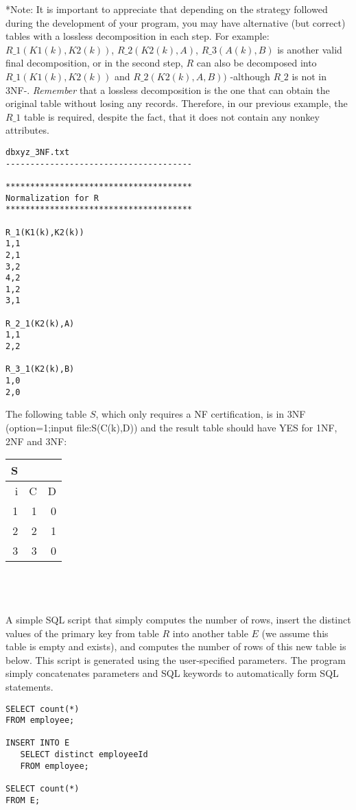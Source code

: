 *Note: It is important to appreciate that depending on the strategy followed during the development of your program, you may
have alternative (but correct) tables with a lossless decomposition in each step. For example: $R\_1(K1(k),K2(k))$, $R\_2(K2(k),A)$, $R\_3(A(k),B)$ is
another valid final decomposition, or in the second step, $R$ can also be decomposed into $R\_1(K1(k),K2(k))$ and $R\_2(K2(k),A,B))$ -although $R\_2$ is not in 3NF-.
\emph{Remember} that a lossless decomposition is the one that can obtain the original table without losing any records. Therefore, in our previous example, the $R\_1$ table is required, despite the fact, that it does not contain any nonkey attributes.

\begin{verbatim}
dbxyz_3NF.txt
--------------------------------------

**************************************
Normalization for R
**************************************

R_1(K1(k),K2(k))
1,1
2,1
3,2
4,2
1,2
3,1

R_2_1(K2(k),A)
1,1
2,2

R_3_1(K2(k),B)
1,0
2,0
\end{verbatim}
The following table $S$, which only requires a NF certification, is in 3NF (option=1;input file:S(C(k),D)) and the result table should have YES for 1NF, 2NF
and 3NF:
\\
\begin{tabular}{r r r}
S & &  \\
\hline
i & C & D \\
\hline
1 & 1 &0 \\
2 & 2 &1 \\
3 & 3 &0 \\
\hline
\end{tabular}
\\
\\
\\
A simple SQL script that simply computes the number of rows, insert the distinct values of the
primary key from table $R$ into another table $E$ (we assume this table is empty and exists), and computes the number of rows of this new table is below. This script is generated using the user-specified parameters. The program
simply concatenates parameters and SQL keywords to automatically form SQL statements.
\\
\begin{verbatim}
SELECT count(*) 
FROM employee;

INSERT INTO E
   SELECT distinct employeeId 
   FROM employee;

SELECT count(*) 
FROM E;
\end{verbatim}


